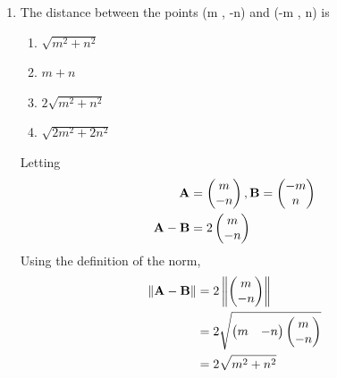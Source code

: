 \documentclass[journal,12pt,twocolumn]{IEEEtran}
\begin{document}
\begin{enumerate}
\item The distance between the points (m , -n) and (-m , n) is
\begin{enumerate}
    \item $\sqrt{m^2 + n^2}$
    \item $m + n$
    \item $2\sqrt{m^2 + n^2}$
    \item $\sqrt{2m^2 + 2n^2}$
\end{enumerate}
		\solution Letting 
		\begin{align}
			\mathbf{A} &= \begin{pmatrix}m \\ -n\end{pmatrix}, \mathbf{B}=\begin{pmatrix}-m \\ n\end{pmatrix}
			\\
			\mathbf{A}-\mathbf{B} &= 2\begin{pmatrix}m \\ -n\end{pmatrix}
		\end{align}
Using the definition   of the norm, 
		\begin{align}
\left\lVert\mathbf{A}-\mathbf{B}\right\rVert &=2\left\lVert\begin{pmatrix}m \\ -n\end{pmatrix}\right\rVert
			\\
			&=2 \sqrt{\begin{pmatrix}m & -n\end{pmatrix}\begin{pmatrix}m \\ -n\end{pmatrix}} 
\\
			&			= 2 \sqrt{m^2+n^2}
		\end{align}


\end{enumerate}
\end{document}
